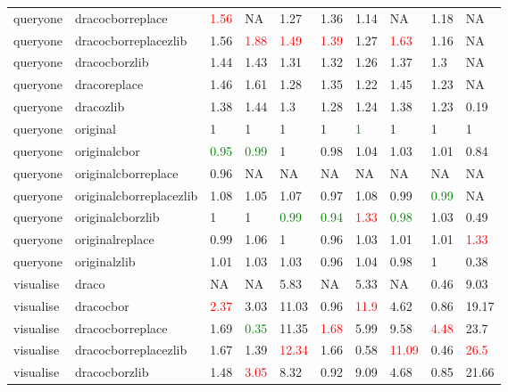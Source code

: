 \begin{landscape}
\begin{longtable}{llllllllll}
queryone & dracocborreplace & \textcolor{red}{1.56} & NA & 1.27 & 1.36 & 1.14 & NA & 1.18 & NA\\
queryone & dracocborreplacezlib & 1.56 & \textcolor{red}{1.88} & \textcolor{red}{1.49} & \textcolor{red}{1.39} & 1.27 & \textcolor{red}{1.63} & 1.16 & NA\\
queryone & dracocborzlib & 1.44 & 1.43 & 1.31 & 1.32 & 1.26 & 1.37 & 1.3 & NA\\
queryone & dracoreplace & 1.46 & 1.61 & 1.28 & 1.35 & 1.22 & 1.45 & 1.23 & NA\\
\rowcolor{lightgray}  queryone & dracozlib & 1.38 & 1.44 & 1.3 & 1.28 & 1.24 & 1.38 & 1.23 & 0.19\\
\rowcolor{lightgray}  queryone & original & 1 & 1 & 1 & 1 & \textcolor{green}{1} & 1 & 1 & 1\\
\rowcolor{lightgray}  queryone & originalcbor & \textcolor{green}{0.95} & \textcolor{green}{0.99} & 1 & 0.98 & 1.04 & 1.03 & 1.01 & 0.84\\
\rowcolor{lightgray}  queryone & originalcborreplace & 0.96 & NA & NA & NA & NA & NA & NA & NA\\
\rowcolor{lightgray}  queryone & originalcborreplacezlib & 1.08 & 1.05 & 1.07 & 0.97 & 1.08 & 0.99 & \textcolor{green}{0.99} & NA\\
\rowcolor{lightgray}  queryone & originalcborzlib & 1 & 1 & \textcolor{green}{0.99} & \textcolor{green}{0.94} & \textcolor{red}{1.33} & \textcolor{green}{0.98} & 1.03 & 0.49\\
\rowcolor{lightgray}  queryone & originalreplace & 0.99 & 1.06 & 1 & 0.96 & 1.03 & 1.01 & 1.01 & \textcolor{red}{1.33}\\
\rowcolor{lightgray}  queryone & originalzlib & 1.01 & 1.03 & 1.03 & 0.96 & 1.04 & 0.98 & 1 & 0.38\\
\rowcolor{lightgray}  visualise & draco & NA & NA & 5.83 & NA & 5.33 & NA & 0.46 & 9.03\\
\rowcolor{lightgray}  visualise & dracocbor & \textcolor{red}{2.37} & 3.03 & 11.03 & 0.96 & \textcolor{red}{11.9} & 4.62 & 0.86 & 19.17\\
\rowcolor{lightgray}  visualise & dracocborreplace & 1.69 & \textcolor{green}{0.35} & 11.35 & \textcolor{red}{1.68} & 5.99 & 9.58 & \textcolor{red}{4.48} & 23.7\\
\rowcolor{lightgray}  visualise & dracocborreplacezlib & 1.67 & 1.39 & \textcolor{red}{12.34} & 1.66 & 0.58 & \textcolor{red}{11.09} & 0.46 & \textcolor{red}{26.5}\\
\rowcolor{lightgray}  visualise & dracocborzlib & 1.48 & \textcolor{red}{3.05} & 8.32 & 0.92 & 9.09 & 4.68 & 0.85 & 21.66\\

\end{longtable}
\end{landscape}
